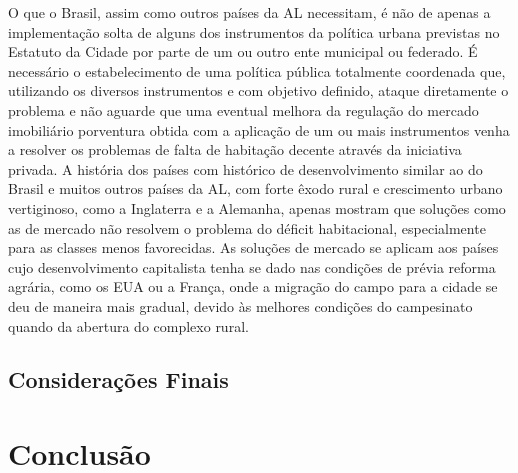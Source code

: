 \documentclass[
	12pt,				%
	oneside,			%
	a4paper,			%
	chapter=TITLE,		%
	section=TITLE,		%
	english,			%
	brazil				%
	]{abntex2}
\begin{document}
\begin{refsection}
O que o Brasil, assim como outros países da \gls{AL} necessitam, é não de
apenas a implementação solta de alguns dos instrumentos da política urbana
previstas no Estatuto da Cidade por parte de um ou outro ente municipal ou
federado. É necessário o estabelecimento de uma política pública totalmente
coordenada que, utilizando os diversos instrumentos e com objetivo definido,
ataque diretamente o problema e não aguarde que uma eventual melhora da
regulação do mercado imobiliário porventura obtida com a aplicação de um ou mais
instrumentos venha a resolver os problemas de falta de habitação decente através
da iniciativa privada. A história dos países com histórico de desenvolvimento
similar ao do Brasil e muitos outros países da \gls{AL}, com forte êxodo rural e
crescimento urbano vertiginoso, como a Inglaterra e a Alemanha, apenas mostram
que soluções como as de mercado não resolvem o problema do déficit habitacional,
especialmente para as classes menos favorecidas. As soluções de mercado se
aplicam aos países cujo desenvolvimento capitalista tenha se dado nas condições
de prévia reforma agrária, como os \gls{EUA} ou a França, onde a migração do campo
para a cidade se deu de maneira mais gradual, devido às melhores condições do
campesinato quando da abertura do complexo rural.

\hypertarget{considerauxe7uxf5es-finais-4}{%
\section{Considerações Finais}\label{considerauxe7uxf5es-finais-4}}

\printbibliography[heading=subbibintoc]
\end{refsection}
\hypertarget{conclusao}{%
\chapter{Conclusão}\label{conclusao}}
\end{document}
